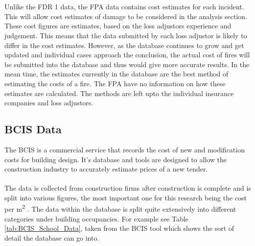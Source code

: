 \documentclass[table,a4paper,oneside]{book}
\newcommand{\mtwo}{m\textsuperscript{2} } %
\begin{document}
\\
\\
Unlike the FDR 1 data, the \ac{FPA} data contains cost estimates for each incident. This will allow cost estimates of damage to be considered in the analysis section. These cost figures are estimates, based on the loss adjustors experience and judgement. This means that the data submitted by each loss adjustor is likely to differ in the cost estimates. However, as the database continues to grow and get updated and individual cases approach the conclusion, the actual cost of fires will be submitted into the database and thus would give more accurate results. In the mean time, the estimates currently in the database are the best method of estimating the costs of a fire. The \ac{FPA} have no information on how these estimates are calculated. The methods are left upto the individual insurance companies and loss adjustors.

\subsection{BCIS Data}
\label{sec:BCIS Data}
The \ac{BCIS} is a commercial service that records the cost of new and modification costs for building design. It's database and tools are designed to allow the construction industry to accurately estimate prices of a new tender.
\\
\\
The data is collected from construction firms after construction is complete and is split into various figures, the most important one for this research being the cost per \mtwo. The data within the database is split quite extensively into different categories under building occupancies. For example see Table \ref{tab:BCIS_School_Data}, taken from the BCIS tool which shows the sort of detail the database can go into.
\end{document}
